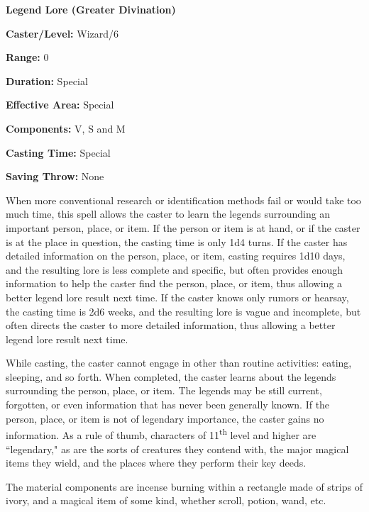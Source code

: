 \begin{multicols}{2}
\noindent
\begin{minipage}{\columnwidth}

\noindent \textbf{Legend Lore (Greater Divination)}

\noindent \textbf{Caster/Level:} Wizard/6

\noindent \textbf{Range:} 0

\noindent \textbf{Duration:} Special

\noindent \textbf{Effective Area:} Special

\noindent \textbf{Components:} V, S and M

\noindent \textbf{Casting Time:} Special

\noindent \textbf{Saving Throw:} None

\end{minipage}

When more conventional research or identification methods fail or would take too much time, this spell allows the caster to learn the legends surrounding an important person, place, or item.  If the person or item is at hand, or if the caster is at the place in question, the casting time is only 1d4 turns.  If the caster has detailed information on the person, place, or item, casting requires 1d10 days, and the resulting lore is less complete and specific, but often provides enough information to help the caster find the person, place, or item, thus allowing a better legend lore result next time.  If the caster knows only rumors or hearsay, the casting time is 2d6 weeks, and the resulting lore is vague and incomplete, but often directs the caster to more detailed information, thus allowing a better legend lore result next time. 

While casting, the caster cannot engage in other than routine activities: eating, sleeping, and so forth.  When completed, the caster learns about the legends surrounding the person, place, or item.  The legends may be still current, forgotten, or even information that has never been generally known.  If the person, place, or item is not of legendary importance, the caster gains no information.  As a rule of thumb, characters of 11\textsuperscript{th} level and higher are ``legendary," as are the sorts of creatures they contend with, the major magical items they wield, and the places where they perform their key deeds.

The material components are incense burning within a rectangle made of strips of ivory, and a magical item of some kind, whether scroll, potion, wand, etc.


\end{multicols}

